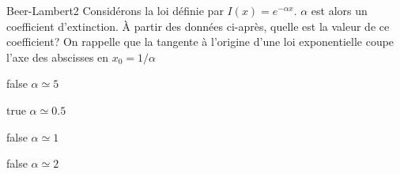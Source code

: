 \documentclass[11pt]{article}
\begin{document}
        \begin{question}{27}{Beer-Lambert}{2}{}
            Considérons la loi définie par $I(x) = e^{-\alpha x}$. $\alpha$ est alors un coefficient d'extinction. À partir des données ci-après, quelle est la valeur de ce coefficient? On rappelle que la tangente à l'origine d'une loi exponentielle coupe l'axe des abscisses en $x_0 = 1/\alpha$
            \begin{figure}
             \end{figure}
        \end{question}
        \begin{reponses}
            \item[false] $\alpha \simeq \num{5}$
		    \item[true] $\alpha \simeq \num{0.5}$
		    \item[false] $\alpha \simeq \num{1}$
		    \item[false] $\alpha \simeq \num{2}$
		    \end{reponses}
        
\end{document}
